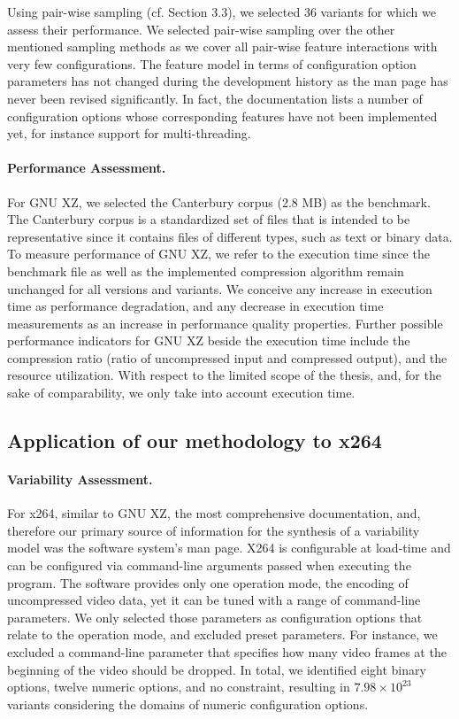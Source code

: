 Using pair-wise sampling (cf. Section 3.3), we selected 36 variants for which
we assess their performance. We selected pair-wise sampling over the other
mentioned sampling methods as we cover all pair-wise feature interactions with
very few configurations. The feature model in terms of configuration option
parameters has not changed during the development history as the man page has
never been revised significantly. In fact, the documentation lists a number of
configuration options whose corresponding features have not been implemented
yet, for instance support for multi-threading.

\paragraph{Performance Assessment.} For GNU XZ, we selected the Canterbury
corpus (2.8 MB) as the benchmark. The Canterbury corpus is a standardized set of files that is
intended to be representative since it contains files of different types, such
as text or binary data. To measure performance of GNU XZ, we refer to the
execution time since the benchmark file as well as the implemented compression
algorithm remain unchanged for all versions and variants. We conceive any
increase in execution time as performance degradation, and any decrease in
execution time measurements as an increase in performance quality properties.
Further possible performance indicators for GNU XZ beside the execution time
include the compression ratio (ratio of uncompressed input and compressed
output), and the resource utilization. With respect to the limited scope of the
thesis, and, for the sake of comparability, we only take into account execution
time.

\subsection{Application of our methodology to x264}
\paragraph{Variability Assessment.} For x264, similar to GNU XZ, the most
comprehensive documentation, and, therefore our primary source of information for the
synthesis of a variability model was the software system’s man page. X264 is
configurable at load-time and can be configured via command-line arguments
passed when executing the program. The software provides only one operation
mode, the encoding of uncompressed video data, yet it can be tuned with a range
of command-line parameters. We only selected those parameters as configuration
options that relate to the operation mode, and excluded preset parameters. For
instance, we excluded a command-line parameter that specifies how many video
frames at the beginning of the video should be dropped. In total, we identified
eight binary options, twelve numeric options, and no constraint, resulting in
$7.98 \times 10^{23}$ variants considering the domains of numeric configuration
options.

